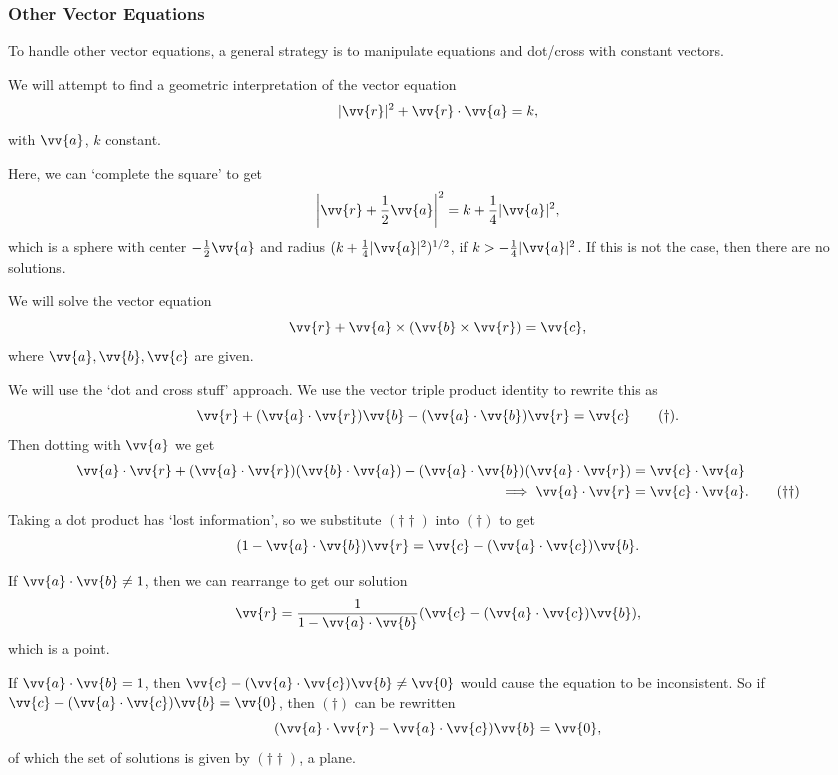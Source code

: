 \subsubsection{Other Vector Equations}

To handle other vector equations, a general strategy is to manipulate equations and dot/cross with constant vectors.

\begin{example}
    We will attempt to find a geometric interpretation of the vector equation
    $$
    |\vv{r}|^2 + \vv{r} \cdot \vv{a} = k,
    $$
    with $\vv{a}$, $k$ constant.

    Here, we can `complete the square' to get
    $$
    \left|\vv{r} + \frac{1}{2}\vv{a}\right|^2 = k + \frac{1}{4}|\vv{a}|^2,
    $$
    which is a sphere with center $-\frac{1}{2}\vv{a}$ and radius $(k + \frac{1}{4}|\vv{a}|^2)^{1/2}$, if $k > - \frac{1}{4}|\vv{a}|^2$. If this is not the case, then there are no solutions.
\end{example}

\begin{example}
    We will solve the vector equation
    $$
    \vv{r} + \vv{a} \times (\vv{b} \times \vv{r}) = \vv{c},
    $$
    where $\vv{a}, \vv{b}, \vv{c}$ are given.

    We will use the `dot and cross stuff' approach. We use the vector triple product identity to rewrite this as
    \begin{equation}
        \vv{r} + (\vv{a} \cdot \vv{r}) \vv{b} - (\vv{a} \cdot \vv{b})\vv{r} = \vv{c} \tag{$\dagger$}.
    \end{equation}
    Then dotting with $\vv{a}$ we get
    \begin{align*}
        \vv{a} \cdot \vv{r} + (\vv{a} \cdot \vv{r})(\vv{b} \cdot \vv{a}) - (\vv{a} \cdot \vv{b})(\vv{a} \cdot \vv{r}) &= \vv{c} \cdot \vv{a} \nonumber \\
\implies \vv{a} \cdot \vv{r} &= \vv{c} \cdot \vv{a}. \tag{$\dagger \dagger$}
    \end{align*}
    Taking a dot product has `lost information', so we substitute $(\dagger \dagger)$ into $(\dagger)$ to get
    $$
    (1 - \vv{a} \cdot \vv{b}) \vv{r} = \vv{c} - (\vv{a} \cdot \vv{c}) \vv{b}.
    $$

    If $\vv{a} \cdot \vv{b} \neq 1$, then we can rearrange to get our solution
    $$
        \vv{r} = \frac{1}{1 - \vv{a} \cdot \vv{b}} ( \vv{c} - (\vv{a} \cdot \vv{c}) \vv{b}),
    $$
    which is a point.

    If $\vv{a} \cdot \vv{b} = 1$, then $\vv{c} - (\vv{a} \cdot \vv{c})\vv{b} \neq \vv{0}$ would cause the equation to be inconsistent. So if $\vv{c} - (\vv{a} \cdot \vv{c})\vv{b} = \vv{0}$, then $(\dagger)$ can be rewritten
    $$
    (\vv{a} \cdot \vv{r} - \vv{a} \cdot \vv{c}) \vv{b} = \vv{0},
    $$
    of which the set of solutions is given by $(\dagger \dagger)$, a plane.
\end{example}

